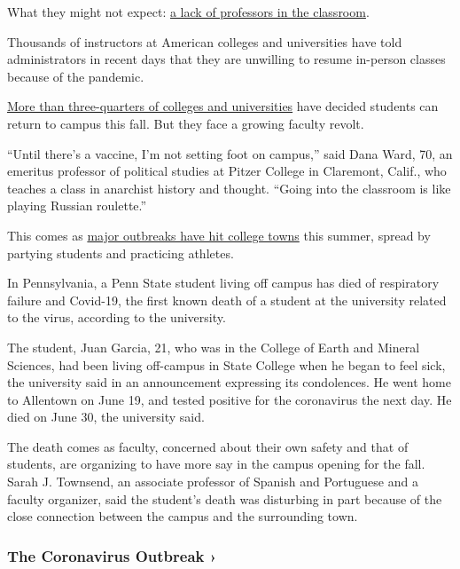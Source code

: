 What they might not expect:
\href{https://www.nytimes3xbfgragh.onion/2020/07/03/us/coronavirus-college-professors.html}{a
lack of professors in the classroom}.

Thousands of instructors at American colleges and universities have told
administrators in recent days that they are unwilling to resume
in-person classes because of the pandemic.

\href{https://www.chronicle.com/article/Here-s-a-List-of-Colleges-/248626}{More
than three-quarters of colleges and universities} have decided students
can return to campus this fall. But they face a growing faculty revolt.

``Until there's a vaccine, I'm not setting foot on campus,'' said Dana
Ward, 70, an emeritus professor of political studies at Pitzer College
in Claremont, Calif., who teaches a class in anarchist history and
thought. ``Going into the classroom is like playing Russian roulette.''

This comes as
\href{https://www.nytimes3xbfgragh.onion/2020/06/28/us/coronavirus-college-towns.html}{major
outbreaks have hit college towns} this summer, spread by partying
students and practicing athletes.

In Pennsylvania, a Penn State student living off campus has died of
respiratory failure and Covid-19, the first known death of a student at
the university related to the virus, according to the university.

The student, Juan Garcia, 21, who was in the College of Earth and
Mineral Sciences, had been living off-campus in State College when he
began to feel sick, the university said in an announcement expressing
its condolences. He went home to Allentown on June 19, and tested
positive for the coronavirus the next day. He died on June 30, the
university said.

The death comes as faculty, concerned about their own safety and that of
students, are organizing to have more say in the campus opening for the
fall. Sarah J. Townsend, an associate professor of Spanish and
Portuguese and a faculty organizer, said the student's death was
disturbing in part because of the close connection between the campus
and the surrounding town.

\href{https://www.nytimes3xbfgragh.onion/news-event/coronavirus?action=click\&pgtype=Article\&state=default\&region=MAIN_CONTENT_3\&context=storylines_faq}{}

\hypertarget{the-coronavirus-outbreak-}{%
\subsubsection{The Coronavirus Outbreak
›}\label{the-coronavirus-outbreak-}}

